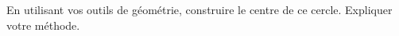 \documentclass[activite]{thedocument}
\begin{document}
    En utilisant vos outils de géométrie, construire le centre de ce cercle. Expliquer votre méthode.\vskip50pt
\end{document}
